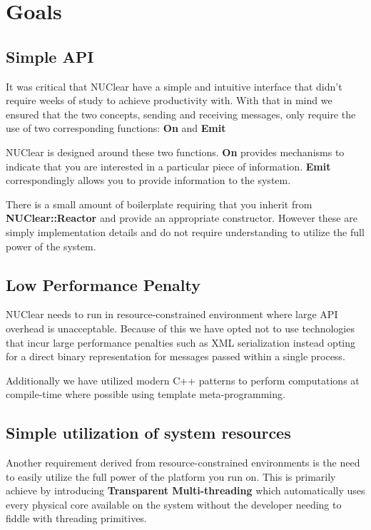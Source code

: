 \documentclass[english,12pt]{scrartcl}
\begin{document}
	\section{Goals}
		\subsection{Simple API}
			It was critical that NUClear have a simple and intuitive interface that didn't require weeks of study to achieve productivity with.
			With that in mind we ensured that the two concepts, sending and receiving messages, only require the use of two corresponding functions: \textbf{On} and \textbf{Emit}
			
			NUClear is designed around these two functions. \textbf{On} provides mechanisms to indicate that you are interested in a particular piece of information.
			\textbf{Emit} correspondingly allows you to provide information to the system.
			
			There is a small amount of boilerplate requiring that you inherit from \textbf{NUClear::Reactor} and provide an appropriate constructor.
			However these are simply implementation details and do not require understanding to utilize the full power of the system.
			
		\subsection{Low Performance Penalty}
			NUClear needs to run in resource-constrained environment where large API overhead is unacceptable.
			Because of this we have opted not to use technologies that incur large performance penalties such as XML serialization 
			instead opting for a direct binary representation for messages passed within a single process. 
			
			Additionally we have utilized modern C++ patterns to perform computations at compile-time where possible using template meta-programming.
			
		\subsection{Simple utilization of system resources}
			Another requirement derived from resource-constrained environments is the need to easily utilize the full power of the platform you run on.
			This is primarily achieve by introducing \textbf{Transparent Multi-threading} which automatically uses every physical core available on the system
			without the developer needing to fiddle with threading primitives.
			
\end{document}
